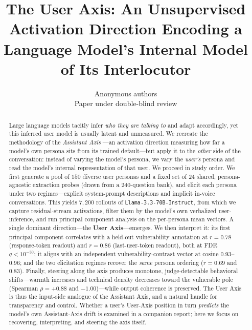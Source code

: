 \documentclass{article}
\title{The User Axis: An Unsupervised Activation Direction Encoding a\\
Language Model's Internal Model of Its Interlocutor}
\author{%
Anonymous authors\\
Paper under double-blind review%
}
\begin{document}
\maketitle

\begin{abstract}
Large language models tacitly infer \emph{who they are talking to} and adapt
accordingly, yet this inferred user model is usually latent and unmeasured. We
recreate the methodology of the \emph{Assistant Axis} \citep{lu2024assistant}---an
activation direction measuring how far a model's own persona sits from its
trained default---but apply it to the \emph{other} side of the conversation:
instead of varying the model's persona, we vary the \emph{user's} persona and
read the model's internal representation of that user. We proceed in study order.
We first generate a pool of $150$ diverse user personas and a fixed set of $24$
shared, persona-agnostic extraction probes (drawn from a $240$-question bank), and
elicit each persona under two regimes---explicit system-prompt descriptions and
implicit in-voice conversations. This yields $7{,}200$ rollouts of
\texttt{Llama-3.3-70B-Instruct}, from which we capture residual-stream activations,
filter them by the model's own verbalized user-inference, and run principal
component analysis on the per-persona mean vectors. A single dominant direction---the
\textbf{User Axis}---emerges. We then interpret it: its first principal component
correlates with a held-out vulnerability annotation at $r{=}0.78$ (response-token
readout) and $r{=}0.86$ (last-user-token readout), both at FDR $q<10^{-30}$; it
aligns with an independent vulnerability-contrast vector at cosine $0.93$--$0.96$;
and the two elicitation regimes recover the \emph{same} persona ordering ($r{=}0.69$
and $0.83$). Finally, steering along the axis produces monotone, judge-detectable
behavioral shifts---warmth increases and technical density decreases toward the
vulnerable pole (Spearman $\rho{=}{+}0.88$ and $-1.00$)---while output coherence is
preserved. The User Axis is thus the input-side analogue of the Assistant Axis,
and a natural handle for transparency and control. Whether a user's User-Axis
position in turn \emph{predicts} the model's own Assistant-Axis drift is examined
in a companion report; here we focus on recovering, interpreting, and steering the
axis itself.
\end{abstract}

\end{document}

